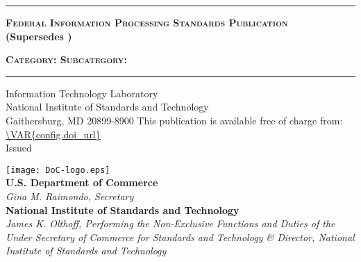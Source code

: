 
\begin{titlepage}


\sffamily

\LARGE{\textbf{}}
\vspace{8pt}
\hrule
\vspace{8pt}
\large{\textbf{\textsc{Federal Information Processing Standards Publication}}}\\
\small{\textbf{(Supersedes )}}

\vfill
\huge{\textbf{}}
\vfill
\normalsize{\textbf{\textsc{Category: 
\hfill Subcategory: 
}}}
\vspace{8pt}
\hrule
\vfill

Information Technology Laboratory\\
National Institute of Standards and Technology\\
Gaithersburg, MD 20899-8900
\vfill
\normalsize This publication is available free of charge from:\\
\url{\VAR{config.doi_url}}\\
\vfill
\normalsize Issued 
\vfill

\texttt{[image: DoC-logo.eps]}\\ 
\vfill
\footnotesize \textbf{U.S. Department of Commerce}\\ 
\textit{Gina M. Raimondo, Secretary}\\
\vspace{10pt}
\textbf{National Institute of Standards and Technology}\\ 
\textit{James K. Olthoff, Performing the Non-Exclusive Functions and Duties of the Under Secretary of Commerce for Standards and Technology \& Director, National Institute of Standards and Technology}
\end{titlepage}
